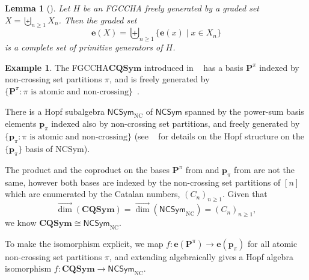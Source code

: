 \documentclass[11pt]{amsart}
\newtheorem{lemma}[theorem]{Lemma}
\theoremstyle{definition}
\newtheorem{example}[theorem]{Example}
\numberwithin{equation}{section}
\newcommand{\FGCCHA}{\textsf{FGCCHA}\xspace}
\newcommand{\vecdim}{\overrightarrow{\dim}}
\newcommand{\lucas}[1]{\todo[size=\tiny,color=red!50]{#1 \\ \hfill --- Lucas}}
\newcommand{\eric}[1]{\todo[size=\tiny,color=BurntOrange!50]{#1 \\ \hfill --- Eric}}
\begin{document}
\begin{lemma}[{\cite[Lemma 22]{PR04}}]
\label{lemma:primitive generators}
Let $H$ be an \FGCCHA freely generated by a graded set $X = \biguplus_{n \geq 1} X_{n}$.  
Then the graded set
\[
\mathbf{e}(X) = \biguplus_{n \ge 1} \{\mathbf{e}(x) \;|\; x \in X_{n}\}
\]
is a complete set of primitive generators of $H$.
\end{lemma}

\begin{example}
    The \FGCCHA $\mathbf{CQSym}$ introduced in ~\cite{NT05} has a basis $\mathbf{P}^{\pi}$
    indexed by non-crossing set partitions $\pi$, and is freely generated by
    $\{\mathbf{P}^{\pi}:\pi \text{ is atomic and non-crossing}\}$~\cite[Proposition 5.2]{NT05}.

    There is a Hopf subalgebra $\mathsf{NCSym}_{\mathrm{NC}}$ of $\mathsf{NCSym}$ spanned by the power-sum basis elements $\mathbf{p}_{\pi}$ indexed also by non-crossing set partitions, and freely generated by $\{\mathbf{p}_{\pi}:\pi \text{ is atomic and non-crossing}\}$ (see ~\cite{BHRZ05} for details on the Hopf structure on the $\{\mathbf{p}_{\pi}\}$ basis of \textsf{NCSym}).

The product and the coproduct on the bases $\mathbf{P}^{\pi}$ from \cite{NT05} and $\mathbf{p}_{\pi}$ from \cite{BHRZ05}
are not the same, however both bases are indexed by the non-crossing set partitions of $[n]$
which are enumerated by the Catalan numbers, $(C_n)_{n \geq 1}$. Given that 
    \[
    \vecdim(\mathbf{CQSym}) = \vecdim(\mathsf{NCSym}_{\mathrm{NC}}) = (C_n)_{n \geq 1},
    \]
    we know $\mathbf{CQSym} \cong \mathsf{NCSym}_{\mathrm{NC}}$.

To make the isomorphism explicit, we map $f:\mathbf{e}(\mathbf{P}^{\pi}) \to \mathbf{e}(\mathbf{p}_{\pi})$
for all atomic non-crossing set partitions $\pi$, and extending algebraically gives a
Hopf algebra isomorphism $f:\mathbf{CQSym} \to \mathsf{NCSym}_{\mathrm{NC}}$.
\end{example}
\end{document}
